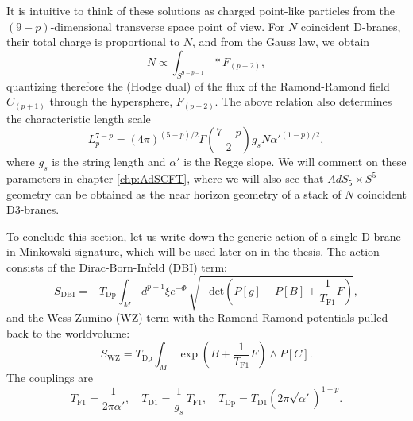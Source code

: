 It is intuitive to think of these solutions as charged point-like particles from the $(9-p)$-dimensional transverse space point of view.
For $N$ coincident D-branes, their total charge is proportional to $N$,
and from the Gauss law, we obtain
\begin{equation}
 N \propto \int_{S^{9-p-1}} *F_{(p+2)},
\end{equation}
quantizing therefore the (Hodge dual) of the flux of the Ramond-Ramond field $C_{(p+1)}$ through the hypersphere, $F_{(p+2)}$.
The above relation also determines the characteristic length scale 
\begin{equation}\label{characteristicLengthLp}
 L_p^{7-p} = (4\pi)^{(5-p)/2} \Gamma \left(\dfrac{7-p}{2}\right) g_s N \alpha'^{(1-p)/2},
\end{equation}
where $g_s$ is the string length and $\alpha'$ is the Regge slope. 
We will comment on these parameters in chapter \ref{chp:AdSCFT},
where we will also see that $AdS_5 \times S^5$ geometry can be obtained as the near horizon geometry of a stack of $N$ coincident D3-branes.

To conclude this section, 
let us write down the generic action of a single D-brane in Minkowski signature, 
which will be used later on in the thesis.
The action consists of the Dirac-Born-Infeld (DBI) term:
\begin{equation}\label{DBI}
 S_\text{DBI} = -T_\text{Dp} \int_M\,  d^{p+1}\xi e^{-\Phi} \, \sqrt{-\text{det}\left( P[g] + P[B] + \dfrac{1}{T_\text{F1}} F \right)},
\end{equation}
and the Wess-Zumino (WZ) term with the Ramond-Ramond potentials pulled back to the worldvolume:
\begin{equation}\label{WZ}
 S_\text{WZ} = T_\text{Dp} \int_M\, \exp{\left(B + \dfrac{1}{T_\text{F1}} F \right)} \wedge  P[C].
\end{equation}
The couplings are
\begin{equation} \label{couplingsTension}
 T_\text{F1} = \dfrac{1}{2\pi\alpha'},
 \quad 
 T_\text{D1} = \dfrac{1}{g_s}\,T_\text{F1},
 \quad 
 T_\text{Dp} =  T_\text{D1}\left(2\pi \sqrt{\alpha'}\right)^{1-p}.
\end{equation}


